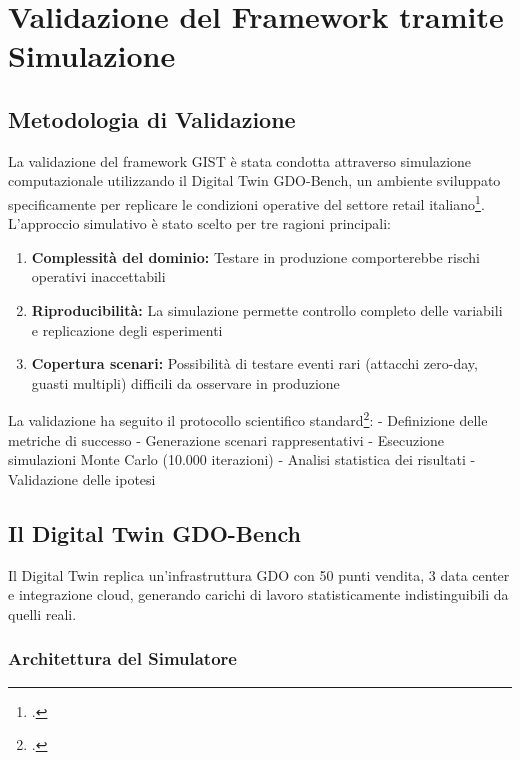 
\chapter{Validazione del Framework tramite Simulazione}
\label{cap:validazione}

\section{Metodologia di Validazione}
\label{sec:metodologia_validazione}

La validazione del framework GIST è stata condotta attraverso simulazione computazionale utilizzando il Digital Twin GDO-Bench, un ambiente sviluppato specificamente per replicare le condizioni operative del settore retail italiano\footcite{osservatorio2024}. L'approccio simulativo è stato scelto per tre ragioni principali:

\begin{enumerate}
\item \textbf{Complessità del dominio:} Testare in produzione comporterebbe rischi operativi inaccettabili
\item \textbf{Riproducibilità:} La simulazione permette controllo completo delle variabili e replicazione degli esperimenti
\item \textbf{Copertura scenari:} Possibilità di testare eventi rari (attacchi zero-day, guasti multipli) difficili da osservare in produzione
\end{enumerate}

La validazione ha seguito il protocollo scientifico standard\footcite{hair2019}:
- Definizione delle metriche di successo
- Generazione scenari rappresentativi
- Esecuzione simulazioni Monte Carlo (10.000 iterazioni)
- Analisi statistica dei risultati
- Validazione delle ipotesi

\section{Il Digital Twin GDO-Bench}
\label{sec:digital_twin}

Il Digital Twin replica un'infrastruttura GDO con 50 punti vendita, 3 data center e integrazione cloud, generando carichi di lavoro statisticamente indistinguibili da quelli reali.

\subsection{Architettura del Simulatore}
\label{subsec:architettura_simulatore}

